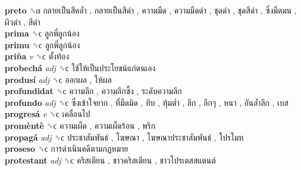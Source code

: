 \textbf{preto} ␝α   กลายเป็นสีคล้ำ ,  กลายเป็นสีดำ ,  ความมืด ,  ความมืดดำ ,  ชุดดำ ,  ชุดสีดำ ,  ซึ่งมืดมน ,  ผิวดำ ,  สีดำ   \\
\textbf{prima} ␝ϲ   ลูกพี่ลูกน้อง   \\
\textbf{primu} ␝ϲ   ลูกพี่ลูกน้อง   \\
\textbf{priña} \emph{v}  ␝ϲ   ตั้งท้อง   \\
\textbf{probechá} \emph{adj}  ␝ϲ   ใช้ให้เป็นประโยชน์แก่ตนเอง   \\
\textbf{produsí} \emph{adj}  ␝ϲ   ออกผล ,  ให้ผล   \\
\textbf{profundidat} ␝ϲ   ความลึก ,  ความลึกซึ้ง ,  ระดับความลึก   \\
\textbf{profundo} \emph{adj}  ␝ϲ   ซึ่งเข้าใจยาก ,  ที่มืดมิด ,  ทึบ ,  ทุ้มต่ำ ,  ลึก ,  ลึกๆ ,  หนา ,  อันล้ำลึก ,  เบส   \\
\textbf{progresá} \emph{v}  ␝ϲ   เคลื่อนไป   \\
\textbf{promèntè} ␝ϲ   ความเผ็ด ,  ความเผ็ดร้อน ,  พริก   \\
\textbf{propagá} \emph{adj}  ␝ϲ   ประชาสัมพันธ์ ,  โฆษณา ,  โฆษณาประชาสัมพันธ์ ,  โปรโมท   \\
\textbf{proseso} ␝ϲ   การดำเนินคดีตามกฏหมาย   \\
\textbf{protestant} \emph{adj}  ␝ϲ   คริสเตียน ,  ชาวคริสเตียน ,  ชาวโปรเตสสแตนต์   \\
